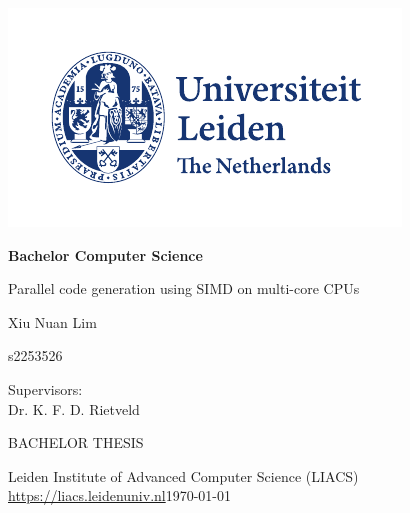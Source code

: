 \thispagestyle{empty}

\includegraphics{UL_Algemeen internationaal_CMYK}

\vspace{-2cm}\hfill \begin{LARGE}\textbf{Bachelor Computer Science}\end{LARGE}

\vspace{3.5cm}
\begin{Large}
\hfill Parallel code generation using SIMD on multi-core CPUs

\vspace{2.0cm}

\hfill Xiu Nuan Lim

\vspace{0.33cm}

\hfill s2253526
\end{Large}

\vspace{5.0cm}

\begin{large}

Supervisors:\\
Dr. K. F. D. Rietveld


\vspace{2.0cm}
BACHELOR THESIS

\vspace{5mm}
Leiden Institute of Advanced Computer Science (LIACS)\\
\url{https://liacs.leidenuniv.nl}\hfill \today
\end{large}

\newpage

